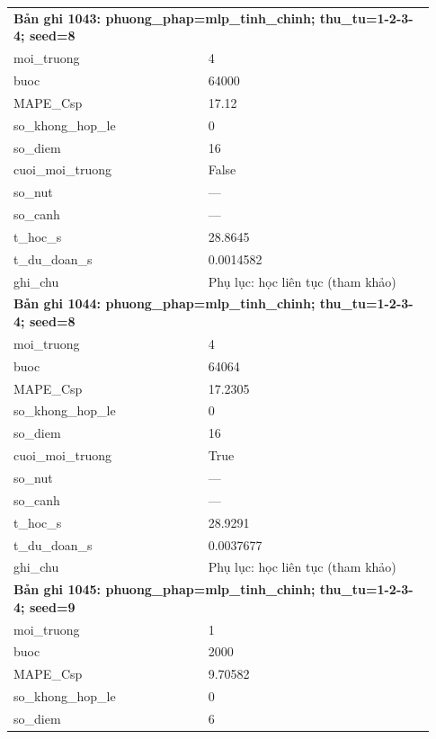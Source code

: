 \begin{longtable}{p{0.43\linewidth}p{0.50\linewidth}}
\midrule
\multicolumn{2}{p{0.95\linewidth}}{\textbf{Bản ghi 1043: phuong\_phap=mlp\_tinh\_chinh; thu\_tu=1-2-3-4; seed=8}} \\
moi\_\allowbreak truong & 4 \\
buoc & 64000 \\
MAPE\_\allowbreak Csp & 17.12 \\
so\_\allowbreak khong\_\allowbreak hop\_\allowbreak le & 0 \\
so\_\allowbreak diem & 16 \\
cuoi\_\allowbreak moi\_\allowbreak truong & False \\
so\_\allowbreak nut & — \\
so\_\allowbreak canh & — \\
t\_\allowbreak hoc\_\allowbreak s & 28.8645 \\
t\_\allowbreak du\_\allowbreak doan\_\allowbreak s & 0.0014582 \\
ghi\_\allowbreak chu & Phụ lục: học liên tục (tham khảo) \\
\midrule
\multicolumn{2}{p{0.95\linewidth}}{\textbf{Bản ghi 1044: phuong\_phap=mlp\_tinh\_chinh; thu\_tu=1-2-3-4; seed=8}} \\
moi\_\allowbreak truong & 4 \\
buoc & 64064 \\
MAPE\_\allowbreak Csp & 17.2305 \\
so\_\allowbreak khong\_\allowbreak hop\_\allowbreak le & 0 \\
so\_\allowbreak diem & 16 \\
cuoi\_\allowbreak moi\_\allowbreak truong & True \\
so\_\allowbreak nut & — \\
so\_\allowbreak canh & — \\
t\_\allowbreak hoc\_\allowbreak s & 28.9291 \\
t\_\allowbreak du\_\allowbreak doan\_\allowbreak s & 0.0037677 \\
ghi\_\allowbreak chu & Phụ lục: học liên tục (tham khảo) \\
\midrule
\multicolumn{2}{p{0.95\linewidth}}{\textbf{Bản ghi 1045: phuong\_phap=mlp\_tinh\_chinh; thu\_tu=1-2-3-4; seed=9}} \\
moi\_\allowbreak truong & 1 \\
buoc & 2000 \\
MAPE\_\allowbreak Csp & 9.70582 \\
so\_\allowbreak khong\_\allowbreak hop\_\allowbreak le & 0 \\
so\_\allowbreak diem & 6 \\

\end{longtable}
